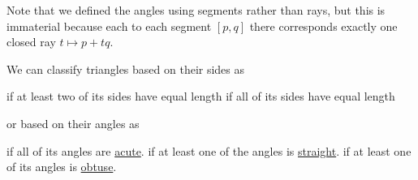 \begin{definition}
  Note that we defined the angles using segments rather than rays, but this is immaterial because each to each segment \( [p, q] \) there corresponds exactly one closed ray \( t \mapsto p + t q \).

  We can classify triangles based on their sides as
  \begin{thmenum}
      if at least two of its sides have equal length
      if all of its sides have equal length
  \end{thmenum}
  or based on their angles as
  \begin{thmenum}
      if all of its angles are \hyperref[def:angle/acute]{acute}.
      if at least one of the angles is \hyperref[def:angle/straight]{straight}.
      if at least one of its angles is \hyperref[def:angle/obtuse]{obtuse}.
  \end{thmenum}
\end{definition}

